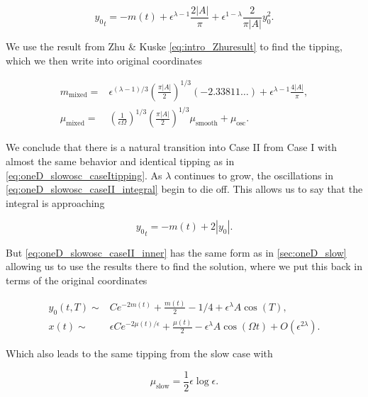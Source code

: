 \begin{equation}\label{eq:oneD_slowosc_caseII_taylor}
{y_0}_t=-m(t)+\epsilon^{\lambda-1}\frac{2|A|}{\pi}+\epsilon^{1-\lambda}\frac{2}{\pi |A|}y_0^2.
\end{equation}

We use the result from Zhu \& Kuske \eqref{eq:intro_Zhuresult} to find the tipping, which we then write into original coordinates

\begin{equation}
\begin{aligned}
m_{\text{mixed}}=&\epsilon^{(\lambda-1)/3}\left(\frac{\pi |A|}{2}\right)^{1/3}(-2.33811\ldots)+\epsilon^{\lambda-1}\frac{4|A|}{\pi},\\
\mu_{\text{mixed}}=&\left(\frac{1}{\epsilon\Omega}\right)^{1/3}\left(\frac{\pi |A|}{2}\right)^{1/3} \mu_{\text{smooth}}+\mu_{\text{osc}}.
\end{aligned}
\end{equation}

We conclude that there is a natural transition into Case II from Case I with almost the same behavior and identical tipping as in \eqref{eq:oneD_slowosc_caseItipping}. As $\lambda$ continues to grow, the oscillations in \eqref{eq:oneD_slowosc_caseII_integral} begin to die off. This allows us to say that the integral is approaching

\begin{equation}\label{eq:oneD_slowosc_caseII_inner}
{y_0}_t = -m(t) +2|y_0|.
\end{equation}

But \eqref{eq:oneD_slowosc_caseII_inner} has the same form as in \autoref{sec:oneD_slow} allowing us to use the results there to find the solution, where we put this back in terms of the original coordinates

\begin{equation}\label{eq:oneD_slowosc_caseIIsoln}
\begin{aligned}
y_0(t,T)\sim& C e^{-2m(t)}+\frac{m(t)}{2}-1/4 +\epsilon^\lambda A\cos(T),\\
x(t)\sim& \epsilon C e^{-2\mu(t)/\epsilon}+\frac{\mu(t)}{2} -\epsilon^\lambda A\cos(\Omega t)+O(\epsilon^{2\lambda}).
\end{aligned}
\end{equation}

Which also leads to the same tipping from the slow case with 

\begin{equation*}
\mu_{\text{slow}}=\frac{1}{2}\epsilon\log\epsilon.
\end{equation*}

